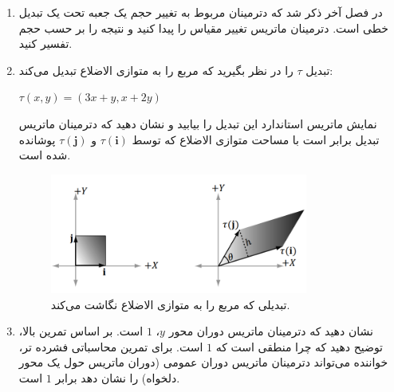 {\begin{spacing}{1.5}
\begin{enumerate}[label=\textbf{\arabic*}.]
            \item {در فصل آخر ذکر شد که دترمینان مربوط به تغییر حجم یک جعبه تحت یک تبدیل خطی است.
            دترمینان ماتریس تغییر مقیاس را پیدا کنید و نتیجه را بر حسب حجم تفسیر کنید.} \\\textbf{\vspace{6pt}}

            \item {
                تبدیل $\tau$ را در نظر بگیرید که مربع را به متوازی الاضلاع تبدیل می‌کند:

                \begin{center}
                    $\tau(x,y)=(3x+y,x+2y)$
                \end{center}

                نمایش ماتریس استاندارد این تبدیل را بیابید و نشان دهید که دترمینان ماتریس تبدیل برابر است با مساحت متوازی الاضلاع که توسط $\tau(\textbf{i})$ و $\tau(\textbf{j})$ پوشانده شده است.

                \begin{figure}[H]
                    \centering
                    \setlength{\belowcaptionskip}{-10pt}
                    \includegraphics[width=0.8\textwidth]{Images/4/3/4.Session.1.3.17}
                    \caption {تبدیلی که مربع را به متوازی الاضلاع نگاشت می‌کند.}
                    \label{fig:4.Session.1.3.17}
                \end{figure}
            }

            \item \label{question:3.24} {نشان دهید که دترمینان ماتریس دوران محور $y$، $1$ است. بر اساس تمرین بالا، توضیح دهید که چرا منطقی است که $1$ است.
            برای تمرین محاسباتی فشرده تر، خواننده می‌تواند دترمینان ماتریس دوران عمومی (دوران ماتریس حول یک محور دلخواه) را نشان دهد برابر $1$ است.} \\\textbf{\vspace{6pt}}


\end{enumerate}
\end{spacing}}
